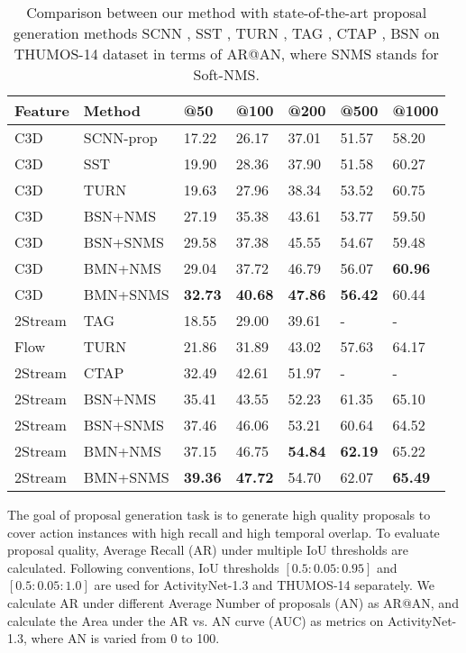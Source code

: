 \documentclass[10pt,twocolumn,letterpaper]{article}
\begin{document}
\begin{table}[tbp]
\centering
\caption{ Comparison between our method with state-of-the-art proposal generation methods SCNN  \cite{shou2016action}, SST \cite{sst_buch_cvpr17}, TURN \cite{gao2017turn}, TAG \cite{zhao2017temporal}, CTAP \cite{gao2018ctap}, BSN \cite{lin2018bsn} on  THUMOS-14 dataset in terms of AR@AN, where SNMS stands for Soft-NMS.} \small
\begin{tabular}{m{1.0cm}<{\centering}m{1.6cm}m{0.55cm}<{\centering}m{0.55cm}<{\centering}m{0.55cm}<{\centering}m{0.55cm}<{\centering}m{0.6cm}<{\centering}}
\toprule
Feature & Method  		& @50 & @100  & @200 & @500 & @1000    \\
\hline 
C3D & SCNN-prop & 17.22 & 26.17 &  37.01 & 51.57 & 58.20   \\
C3D & SST		& 19.90 & 28.36 &  37.90 & 51.58 & 60.27   \\
C3D & TURN 		& 19.63 & 27.96 &  38.34 & 53.52 & 60.75 \\
C3D & BSN+NMS 	& 27.19 & 35.38 &  43.61 &  53.77  & 59.50   \\
C3D & BSN+SNMS 	& 29.58 & 37.38 &  45.55 &  54.67  & 59.48   \\
\hline
C3D & BMN+NMS	&  29.04 &  37.72 & 46.79 & 56.07 & {\bf 60.96}  \\
C3D & BMN+SNMS 	& {\bf 32.73} & {\bf 40.68} &  {\bf 47.86} &  {\bf 56.42}  & 60.44   \\
\hline 
\hline
2Stream & TAG 	& 18.55 & 29.00  &  39.61 & - & -  \\
Flow & TURN		& 21.86 & 31.89 & 43.02 & 57.63  & 64.17  \\
2Stream & CTAP  & 32.49 & 42.61 & 51.97 & -  & -  \\
2Stream & BSN+NMS & 	 35.41 & 43.55 &  52.23 &  61.35 & 65.10  \\
2Stream & BSN+SNMS & 	 37.46 & 46.06 &  53.21 & 60.64 & 64.52 \\
\hline
2Stream & BMN+NMS & 	37.15 & 46.75 &  {\bf 54.84} & {\bf 62.19} & 65.22 \\
2Stream & BMN+SNMS & {\bf 39.36} & {\bf 47.72} &  54.70 &  62.07 & {\bf 65.49}  \\
\bottomrule
\end{tabular}
\label{table:proposal_thumos}
\vspace{-0.1cm}
\end{table}



The goal of proposal generation task is to generate high quality proposals to cover  action instances with high recall and high temporal overlap. 
To evaluate proposal quality, Average Recall (AR) under multiple IoU thresholds are calculated. Following   conventions,  IoU thresholds $[0.5:0.05:0.95]$ and $[0.5:0.05:1.0]$ are used for ActivityNet-1.3 and  THUMOS-14 separately. 
We calculate AR under different Average Number of proposals (AN) as AR@AN, and calculate the Area under the AR vs. AN curve (AUC) as metrics on ActivityNet-1.3, where AN is varied from 0 to 100.
\end{document}
